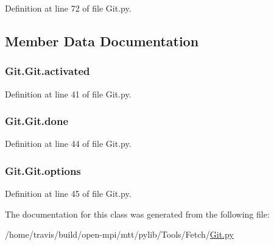 Definition at line 72 of file Git.\-py.



\subsection{Member Data Documentation}
\hypertarget{class_git_1_1_git_a22d3012cb93bad0a9122dd84afdfeee9}{
\subsubsection[{activated}]{\setlength{\rightskip}{0pt plus 5cm}Git.\-Git.\-activated}}\label{class_git_1_1_git_a22d3012cb93bad0a9122dd84afdfeee9}


Definition at line 41 of file Git.\-py.

\hypertarget{class_git_1_1_git_adb8991008d4bb4568fa9c2f991711cda}{
\subsubsection[{done}]{\setlength{\rightskip}{0pt plus 5cm}Git.\-Git.\-done}}\label{class_git_1_1_git_adb8991008d4bb4568fa9c2f991711cda}


Definition at line 44 of file Git.\-py.

\hypertarget{class_git_1_1_git_a7560b88b014c5da8785739c7bb6283ed}{
\subsubsection[{options}]{\setlength{\rightskip}{0pt plus 5cm}Git.\-Git.\-options}}\label{class_git_1_1_git_a7560b88b014c5da8785739c7bb6283ed}


Definition at line 45 of file Git.\-py.



The documentation for this class was generated from the following file\-:\begin{DoxyCompactItemize}
\item 
/home/travis/build/open-\/mpi/mtt/pylib/\-Tools/\-Fetch/\hyperlink{_git_8py}{Git.\-py}\end{DoxyCompactItemize}
